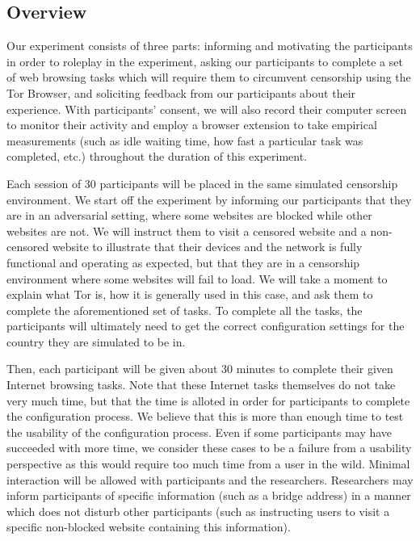 \documentclass[letterpaper,twocolumn,11pt]{article}
\begin{document}
\subsection{Overview} 
Our experiment consists of three parts: informing and motivating the participants in order 
to roleplay in the experiment, asking our participants to complete a set of web browsing tasks which will 
require them to circumvent censorship using the Tor Browser, and soliciting feedback from our participants
about their experience. With participants' consent, we will also record their computer screen to monitor 
their activity and employ a browser extension to take empirical measurements (such as idle waiting time, 
how fast a particular task was completed, etc.) throughout the duration of this experiment. 

Each session of 30 participants will be placed in the same simulated censorship environment. 
We start off the experiment by informing our participants that they are in an adversarial setting, 
where some websites are blocked while other websites are not. We will instruct them to visit a censored
website and a non-censored website to illustrate that their devices and the network is fully functional and
operating as expected, but that they are in a censorship environment where some websites will fail to load. 
We will take a moment to explain what Tor is, how it is generally used in this case, and ask them to complete 
the aforementioned set of tasks. To complete all the tasks, the participants will ultimately need to get the correct
configuration settings for the country they are simulated to be in. 

Then, each participant will be given about 30 minutes to complete their given Internet browsing tasks. 
Note that these Internet tasks themselves do not take very much time, but that the time is alloted in order
for participants to complete the configuration process. We believe that this is more than enough time to 
test the usability of the configuration process. Even if some participants may have succeeded with more 
time, we consider these cases to be a failure from a usability perspective as this would require too much
time from a user in the wild. Minimal interaction will be allowed with participants and the researchers. 
Researchers may inform participants of specific information (such as a bridge address) in a manner 
which does not disturb other participants (such as instructing users to visit a specific non-blocked website 
containing this information). 
\end{document}
